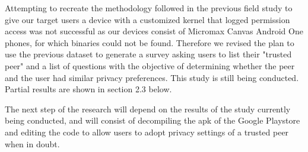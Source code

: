 Attempting to recreate the methodology followed in the previous field study to give our target users a device with a customized kernel that logged permission access was not successful as our devices consist of Micromax Canvas Android One phones, for which binaries could not be found. Therefore we revised the plan to use the previous dataset to generate a survey asking users to list their "trusted peer" and a list of questions with the objective of determining whether the peer and the user had similar privacy preferences. This study is still being conducted. Partial results are shown in section 2.3 below.
\smallskip

The next step of the research will depend on the results of the study currently being conducted, and will consist of decompiling the apk of the Google Playstore and editing the code to allow users to adopt privacy settings of a trusted peer when in doubt.


